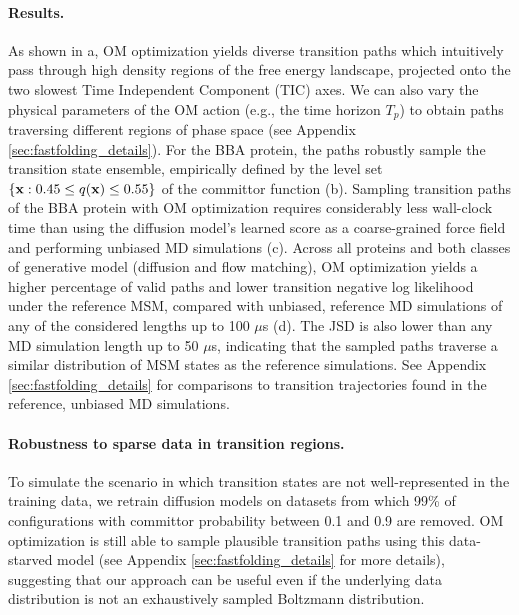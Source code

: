 \paragraph{Results.} As shown in a, OM optimization yields diverse transition paths which intuitively pass through high density regions of the free energy landscape, projected onto the two slowest Time Independent Component (TIC) \cite{noe2013projected} axes. We can also vary the physical parameters of the OM action (e.g., the time horizon $T_p$) to obtain paths traversing different regions of phase space (see Appendix \ref{sec:fastfolding_details}). For the BBA protein, the paths robustly sample the transition state ensemble, empirically defined by the level set $\left \{ \mathbf{x} : 0.45 \leq q(\mathbf{x}) \leq 0.55 \right \}$ of the committor function (b). Sampling transition paths of the BBA protein with OM optimization requires considerably less wall-clock time than using the diffusion model's learned score as a coarse-grained force field and performing unbiased MD simulations (c). Across all proteins and both classes of generative model (diffusion and flow matching), OM optimization yields a higher percentage of valid paths and lower transition negative log likelihood under the reference MSM, compared with unbiased, reference MD simulations of any of the considered lengths up to 100 $\mu$s (d). The JSD is also lower than any MD simulation length up to 50 $\mu$s, indicating that the sampled paths traverse a similar distribution of MSM states as the reference simulations. See Appendix \ref{sec:fastfolding_details} for comparisons to transition trajectories found in the reference, unbiased MD simulations. %
\vspace{-5pt}
\paragraph{Robustness to sparse data in transition regions.} To simulate the scenario in which transition states are not well-represented in the training data, we retrain diffusion models on datasets from which 99\% of configurations with committor probability between 0.1 and 0.9 are removed. OM optimization is still able to sample plausible transition paths using this data-starved model (see Appendix \ref{sec:fastfolding_details} for more details), suggesting that our approach can be useful even if the underlying data distribution is not an exhaustively sampled Boltzmann distribution.
\vspace{-5pt}

